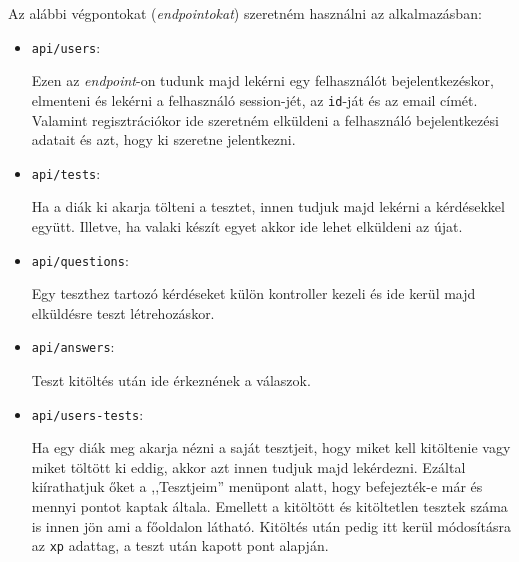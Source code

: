 \label{API}

Az alábbi végpontokat (\textit{endpointokat}) szeretném használni az alkalmazásban:

\begin{itemize}
    \item \texttt{api/users}:
          \begin{addmargin}[\parindent]{0pt}
            Ezen az \textit{endpoint}-on tudunk majd lekérni egy felhasználót bejelentkezéskor, elmenteni és lekérni a felhasználó session-jét, az \texttt{id}-ját és az email címét. Valamint regisztrációkor ide szeretném elküldeni a felhasználó bejelentkezési adatait és azt, hogy ki szeretne jelentkezni.
          \end{addmargin}

    \item \texttt{api/tests}:
          \begin{addmargin}[\parindent]{0pt}
            Ha a diák ki akarja tölteni a tesztet, innen tudjuk majd lekérni a kérdésekkel együtt. Illetve, ha valaki készít egyet akkor ide lehet elküldeni az újat.
          \end{addmargin}

    \item \texttt{api/questions}:
          \begin{addmargin}[\parindent]{0pt}
            Egy teszthez tartozó kérdéseket külön kontroller kezeli és ide kerül majd elküldésre teszt létrehozáskor.
          \end{addmargin}
          
    \item \texttt{api/answers}:
        \begin{addmargin}[\parindent]{0pt}
            Teszt kitöltés után ide érkeznének a válaszok.
        \end{addmargin}
    
    \item \texttt{api/users-tests}:
          \begin{addmargin}[\parindent]{0pt}
            Ha egy diák meg akarja nézni a saját tesztjeit, hogy miket kell kitöltenie vagy miket töltött ki eddig, akkor azt innen tudjuk majd lekérdezni. Ezáltal kiírathatjuk őket a ,,Tesztjeim'' menüpont alatt, hogy befejezték-e már és mennyi pontot kaptak általa. Emellett a kitöltött és kitöltetlen tesztek száma is innen jön ami a főoldalon látható. Kitöltés után pedig itt kerül módosításra az \texttt{xp} adattag, a teszt után kapott pont alapján.
          \end{addmargin}
\end{itemize}
